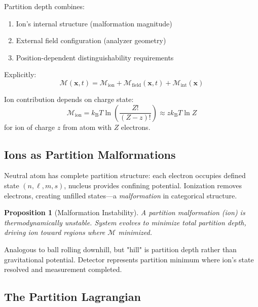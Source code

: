 \documentclass[twocolumn,10pt]{revtex4-2}
\newtheorem{proposition}[theorem]{Proposition}
\theoremstyle{definition}
\theoremstyle{remark}
\newcommand{\kB}{k_{\mathrm{B}}}
\newcommand{\Mdepth}{\mathcal{M}}
\begin{document}
\noindent Partition depth combines:
\begin{enumerate}
\item Ion's internal structure (malformation magnitude)
\item External field configuration (analyzer geometry)
\item Position-dependent distinguishability requirements
\end{enumerate}

Explicitly:
\begin{equation}
\Mdepth(\mathbf{x}, t) = \Mdepth_{\mathrm{ion}} + \Mdepth_{\mathrm{field}}(\mathbf{x}, t) + \Mdepth_{\mathrm{int}}(\mathbf{x})
\label{eq:partition_depth_total}
\end{equation}

Ion contribution depends on charge state:
\begin{equation}
\Mdepth_{\mathrm{ion}} = \kB T \ln\left(\frac{Z!}{(Z-z)!}\right) \approx z \kB T \ln Z
\label{eq:ion_depth}
\end{equation}
for ion of charge $z$ from atom with $Z$ electrons.

\subsection{Ions as Partition Malformations}

Neutral atom has complete partition structure: each electron occupies defined state $(n, \ell, m, s)$, nucleus provides confining potential. Ionization removes electrons, creating unfilled states—a \emph{malformation} in categorical structure.

\begin{proposition}[Malformation Instability]
\label{prop:malformation}
A partition malformation (ion) is thermodynamically unstable. System evolves to minimize total partition depth, driving ion toward regions where $\Mdepth$ minimized.
\end{proposition}

\noindent Analogous to ball rolling downhill, but "hill" is partition depth rather than gravitational potential. Detector represents partition minimum where ion's state resolved and measurement completed.

\subsection{The Partition Lagrangian}
\end{document}
